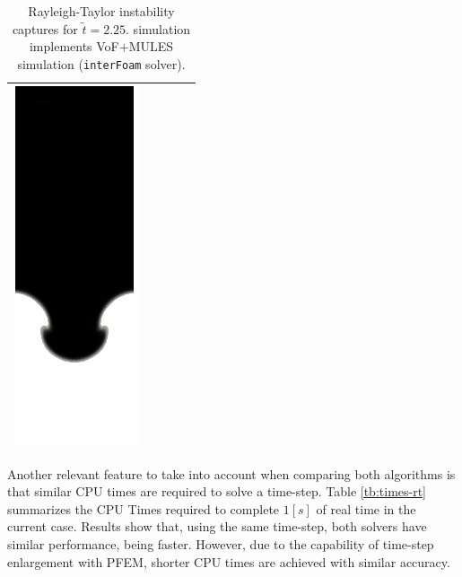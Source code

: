 \begin{table}[H]
\begin{center}
\begin{tabular}{m{} | >{\centering}m{} | >{\centering}m{} | >{\centering}m{} | m{} }
      \includegraphics[width=.18\columnwidth]{images/rayleigh_foam_dts_D.jpg}
      \\
      \hline
\end{tabular}
\caption{\label{fg:rayleigh-comparison-dts} Rayleigh-Taylor instability captures for $\widetilde{t}=2.25$. \OF simulation implements VoF+MULES simulation  (\texttt{interFoam} solver).}
\end{center}
\end{table}
% 
% 
% 
% 

Another relevant feature to take into account when comparing both algorithms is that similar CPU times are required to solve a time-step.
Table \ref{tb:times-rt} summarizes the CPU Times required to complete $1[s]$ of real time in the current case. Results show that, using the same time-step, both solvers have similar performance, being \OF faster. However, due to the capability of time-step enlargement with PFEM, shorter CPU times are achieved with similar accuracy.

